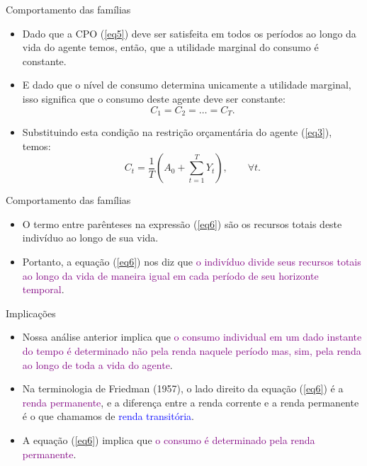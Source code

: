 \documentclass[10pt]{beamer}
\begin{document}
\begin{frame}{Comportamento das famílias}
    \begin{itemize}
        \item Dado que a CPO (\ref{eq5}) deve ser satisfeita em todos os períodos ao longo da vida do agente temos, então, que a utilidade marginal do consumo é constante.
        \bigskip
        \item E dado que o nível de consumo determina unicamente a utilidade marginal, isso significa que o consumo deste agente deve ser constante:
        \[
        C_1 = C_2 = \dots = C_T.
        \]
        \bigskip
        \item Substituindo esta condição na restrição orçamentária do agente (\ref{eq3}), temos:
        \begin{equation}
            C_t = \frac{1}{T}\left(A_0 + \sum_{t=1}^T Y_t\right), \qquad \forall t. \label{eq6}
        \end{equation}
    \end{itemize}
\end{frame}

\begin{frame}{Comportamento das famílias}
    \begin{itemize}
        \item O termo entre parênteses na expressão (\ref{eq6}) são os recursos totais deste indivíduo ao longo de sua vida.
        \bigskip
        \item Portanto, a equação (\ref{eq6}) nos diz que \textcolor{purple}{o indivíduo divide seus recursos totais ao longo da vida de maneira igual em cada período de seu horizonte temporal}.
    \end{itemize}
\end{frame}

\begin{frame}{Implicações}
    \begin{itemize}
        \item Nossa análise anterior implica que \textcolor{purple}{o consumo individual em um dado instante do tempo é determinado não pela renda naquele período mas, sim, pela renda ao longo de toda a vida do agente}.
        \bigskip
        \item Na terminologia de Friedman (1957), o lado direito da equação (\ref{eq6}) é a \textcolor{purple}{renda permanente}, e a diferença entre a renda corrente e a renda permanente é o que chamamos de \textcolor{blue}{renda transitória}.
        \bigskip
        \item A equação (\ref{eq6}) implica que \textcolor{purple}{o consumo é determinado pela renda permanente}.
    \end{itemize}
\end{frame}
\end{document}
